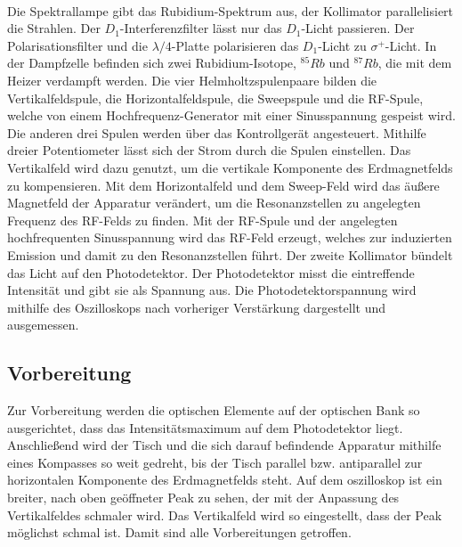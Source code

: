 \\Die Spektrallampe gibt das Rubidium-Spektrum aus, der Kollimator parallelisiert die Strahlen.
Der $D_{1}$-Interferenzfilter lässt nur das $D_{1}$-Licht passieren.
Der Polarisationsfilter und die $\lambda/4$-Platte polarisieren das $D_{1}$-Licht zu $\sigma^{+}$-Licht.
In der Dampfzelle befinden sich zwei Rubidium-Isotope, $^{85}Rb$ und $^{87}Rb$, die mit dem Heizer verdampft werden.
Die vier Helmholtzspulenpaare bilden die Vertikalfeldspule, die Horizontalfeldspule, die Sweepspule und die RF-Spule, welche von einem Hochfrequenz-Generator mit einer Sinusspannung gespeist wird.
Die anderen drei Spulen werden über das Kontrollgerät angesteuert.
Mithilfe dreier Potentiometer lässt sich der Strom durch die Spulen einstellen.
Das Vertikalfeld wird dazu genutzt, um die vertikale Komponente des Erdmagnetfelds zu kompensieren.
Mit dem Horizontalfeld und dem Sweep-Feld wird das äußere Magnetfeld der Apparatur verändert, um die Resonanzstellen zu angelegten Frequenz des RF-Felds zu finden.
Mit der RF-Spule und der angelegten hochfrequenten Sinusspannung wird das RF-Feld erzeugt, welches zur induzierten Emission und damit zu den Resonanzstellen führt.
Der zweite Kollimator bündelt das Licht auf den Photodetektor.
Der Photodetektor misst die eintreffende Intensität und gibt sie als Spannung aus.
Die Photodetektorspannung wird mithilfe des Oszilloskops nach vorheriger Verstärkung dargestellt und ausgemessen.

\subsection{Vorbereitung}
%
%
Zur Vorbereitung werden die optischen Elemente auf der optischen Bank so ausgerichtet, dass das Intensitätsmaximum auf dem Photodetektor liegt.
Anschließend wird der Tisch und die sich darauf befindende Apparatur mithilfe eines Kompasses so weit gedreht, bis der Tisch parallel bzw. antiparallel zur horizontalen Komponente des Erdmagnetfelds steht.
Auf dem oszilloskop ist ein breiter, nach oben geöffneter Peak zu sehen, der mit der Anpassung des Vertikalfeldes schmaler wird.
Das Vertikalfeld wird so eingestellt, dass der Peak möglichst schmal ist.
Damit sind alle Vorbereitungen getroffen.

